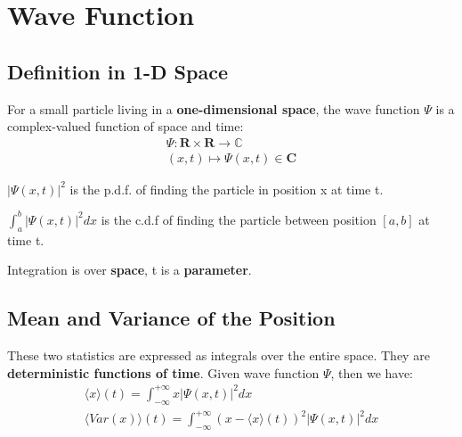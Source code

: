 \section{Wave Function}
\subsection{Definition in 1-D Space}
\begin{definition}
    For a small particle living in a \textbf{{one-dimensional space}}, the wave function $\Psi$ is a complex-valued function of space and time:
    $$
        \begin{gathered}
            \Psi: \mathbf{R} \times \mathbf{R} \rightarrow \mathbb{C} \\
            (x, t) \mapsto \Psi(x, t) \in \mathbf{C}
        \end{gathered}
    $$
\end{definition}

\begin{remark}
    $
        |\Psi(x,t)|^2
    $
    is the p.d.f. of finding the particle in position x at time t.
\end{remark}
\begin{remark}
    $
        \int_{a}^{b} |\Psi(x,t)|^2 dx
    $
    is the c.d.f of finding the particle between position $[a, b]$ at time t.
\end{remark}
\begin{remark}
    Integration is over \textbf{space}, t is a \textbf{parameter}.
\end{remark}
\newpage
\subsection{Mean and Variance of the Position}
These two statistics are expressed as integrals over the entire space. They are \textbf{deterministic functions of time}. Given wave function $\Psi$, then we have: 
$$
\begin{gathered}
    \langle x\rangle(t)=\int_{-\infty}^{+\infty} x|\Psi(x, t)|^{2} d x\\
    \langle Var(x)\rangle(t)=\int_{-\infty}^{+\infty}(x-\langle x\rangle(t))^{2}|\Psi(x, t)|^{2} d x
\end{gathered}
$$